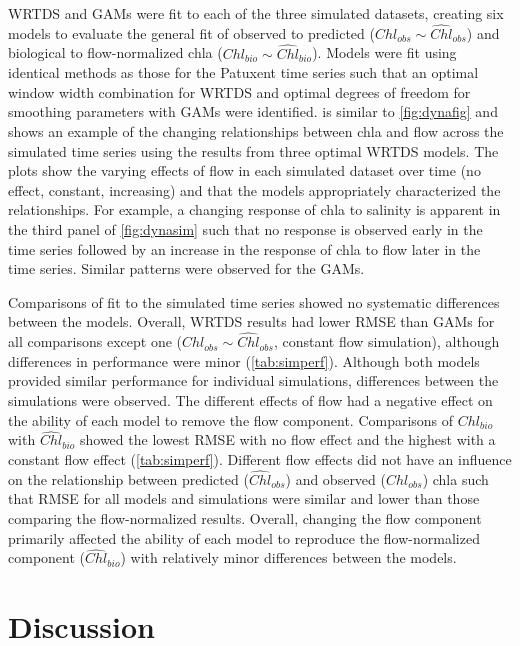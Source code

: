 \documentclass{svjour3}\usepackage[]{graphicx}\usepackage[]{color}
\begin{document}
\ac{WRTDS} and \acp{GAM} were fit to each of the three simulated datasets, creating six models to evaluate the general fit of observed to predicted ($Chl_{obs} \sim \widehat{Chl}_{obs}$) and biological to flow-normalized \ac{chla} ($Chl_{bio} \sim \widehat{Chl}_{bio}$).  Models were fit using identical methods as those for the Patuxent time series such that an optimal window width combination for \ac{WRTDS} and optimal degrees of freedom for smoothing parameters with \acp{GAM} were identified.   is similar to \cref{fig:dynafig} and shows an example of the changing relationships between \ac{chla} and flow across the simulated time series using the results from three optimal \ac{WRTDS} models.  The plots show the varying effects of flow in each simulated dataset over time (no effect, constant, increasing) and that the models appropriately characterized the relationships.  For example, a changing response of \ac{chla} to salinity is apparent in the third panel of \cref{fig:dynasim} such that no response is observed early in the time series followed by an increase in the response of \ac{chla} to flow later in the time series.  Similar patterns were observed for the \acp{GAM}.

Comparisons of fit to the simulated time series showed no systematic differences between the models.  Overall, \ac{WRTDS} results had lower \ac{RMSE} than \acp{GAM} for all comparisons except one ($Chl_{obs} \sim \widehat{Chl}_{obs}$, constant flow simulation), although differences in performance were minor (\cref{tab:simperf}).  Although both models provided similar performance for individual simulations, differences between the simulations were observed.  The different effects of flow had a negative effect on the ability of each model to remove the flow component.  Comparisons of $Chl_{bio}$ with $\widehat{Chl}_{bio}$ showed the lowest \ac{RMSE} with no flow effect and the highest with a constant flow effect (\cref{tab:simperf}).  Different flow effects did not have an influence on the relationship between predicted ($\widehat{Chl}_{obs}$) and observed ($Chl_{obs}$) \ac{chla} such that \ac{RMSE} for all models and simulations were similar and lower than those comparing the flow-normalized results.  Overall, changing the flow component primarily affected the ability of each model to reproduce the flow-normalized component ($\widehat{Chl}_{bio}$) with relatively minor differences between the models. 

\section{Discussion}
\end{document}
